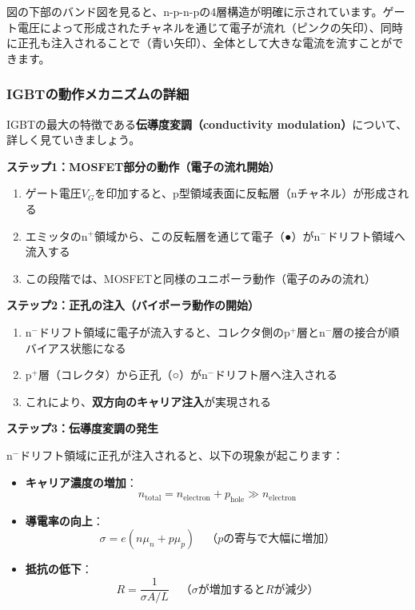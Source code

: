 図の下部のバンド図を見ると、n-p-n-pの4層構造が明確に示されています。ゲート電圧によって形成されたチャネルを通じて電子が流れ（ピンクの矢印）、同時に正孔も注入されることで（青い矢印）、全体として大きな電流を流すことができます。

\subsubsection{IGBTの動作メカニズムの詳細}

IGBTの最大の特徴である\textbf{伝導度変調（conductivity modulation）}について、詳しく見ていきましょう。

\textbf{ステップ1：MOSFET部分の動作（電子の流れ開始）}

\begin{enumerate}
\item ゲート電圧$V_G$を印加すると、p型領域表面に反転層（nチャネル）が形成される
\item エミッタのn$^+$領域から、この反転層を通じて電子（●）がn$^-$ドリフト領域へ流入する
\item この段階では、MOSFETと同様のユニポーラ動作（電子のみの流れ）
\end{enumerate}

\textbf{ステップ2：正孔の注入（バイポーラ動作の開始）}

\begin{enumerate}
\item n$^-$ドリフト領域に電子が流入すると、コレクタ側のp$^+$層とn$^-$層の接合が順バイアス状態になる
\item p$^+$層（コレクタ）から正孔（○）がn$^-$ドリフト層へ注入される
\item これにより、\textbf{双方向のキャリア注入}が実現される
\end{enumerate}

\textbf{ステップ3：伝導度変調の発生}

n$^-$ドリフト領域に正孔が注入されると、以下の現象が起こります：

\begin{itemize}
\item \textbf{キャリア濃度の増加}：
\begin{equation}
n_{\text{total}} = n_{\text{electron}} + p_{\text{hole}} \gg n_{\text{electron}}
\end{equation}

\item \textbf{導電率の向上}：
\begin{equation}
\sigma = e(n\mu_n + p\mu_p) \quad \text{（$p$の寄与で大幅に増加）}
\end{equation}

\item \textbf{抵抗の低下}：
\begin{equation}
R = \frac{1}{\sigma A/L} \quad \text{（$\sigma$が増加すると$R$が減少）}
\end{equation}
\end{itemize}

